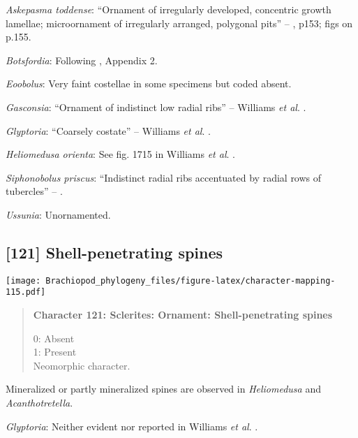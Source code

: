 \documentclass[openany]{book}
\theoremstyle{definition}
\theoremstyle{definition}
\theoremstyle{definition}
\theoremstyle{remark}
\begin{document}
\hypertarget{Askepasma_toddense-coding-120}{}
\emph{Askepasma toddense}: ``Ornament of irregularly developed,
concentric growth lamellae; microornament of irregularly arranged,
polygonal pits'' -- \citet{Williams2000LinguliformeaCraniiformea}, p153;
figs on p.155.

\hypertarget{Botsfordia-coding-120}{}
\emph{Botsfordia}: Following \citet{Williams1998Thediversity}, Appendix
2.

\hypertarget{Eoobolus-coding-120}{}
\emph{Eoobolus}: Very faint costellae in some specimens but coded
absent.

\hypertarget{Gasconsia-coding-120}{}
\emph{Gasconsia}: ``Ornament of indistinct low radial ribs'' -- Williams
\emph{et al}. \citeyearpar[p167]{Williams2000LinguliformeaCraniiformea}.

\hypertarget{Glyptoria-coding-120}{}
\emph{Glyptoria}: ``Coarsely costate'' -- Williams \emph{et al}.
\citeyearpar[p710]{Williams2000LinguliformeaCraniiformea}.

\hypertarget{Heliomedusa_orienta-coding-120}{}
\emph{Heliomedusa orienta}: See fig. 1715 in Williams \emph{et al}.
\citeyearpar{Williams2007Supplement}.

\hypertarget{Siphonobolus_priscus-coding-120}{}
\emph{Siphonobolus priscus}: ``Indistinct radial ribs accentuated by
radial rows of tubercles'' -- \citet{Popov2009Earlyontogeny}.

\hypertarget{Ussunia-coding-120}{}
\emph{Ussunia}: Unornamented.

\subsection*{{[}121{]} Shell-penetrating
spines}\label{shell-penetrating-spines}

\texttt{[image: Brachiopod\_phylogeny\_files/figure-latex/character-mapping-115.pdf]}

\begin{quote}
\textbf{Character 121: Sclerites: Ornament: Shell-penetrating spines}

0: Absent\\
1: Present\\
Neomorphic character.
\end{quote}

Mineralized or partly mineralized spines are observed in
\emph{Heliomedusa} and \emph{Acanthotretella}.

\hypertarget{Glyptoria-coding-121}{}
\emph{Glyptoria}: Neither evident nor reported in Williams \emph{et al}.
\citeyearpar{Williams2000LinguliformeaCraniiformea}.
\end{document}
